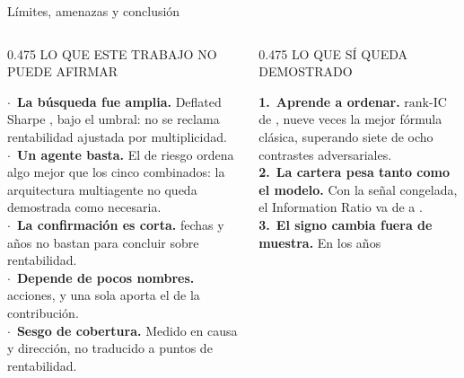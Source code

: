 \documentclass[aspectratio=169,11pt]{beamer}
\newcommand{\acto}{navy}
\newcommand{\actonombre}{}
\newcommand{\setacto}[2]{\renewcommand{\acto}{#1}\renewcommand{\actonombre}{#2}}
\newcommand{\rankic}{\text{rank-IC}}
\begin{document}
\setacto{navy}{Cierre}

\begin{frame}{Límites, amenazas y conclusión}
  \vspace{0.15cm}
  \begin{columns}[T]
    \begin{column}{0.475\linewidth}
      {\scriptsize\color{slate}\MakeUppercase{Lo que este trabajo no puede afirmar}}
      \par\medskip
      {\scriptsize
      \textcolor{rojo}{\textbf{$\cdot$}}~\textbf{La búsqueda fue amplia.} Deflated Sharpe
      \ProbabilidadDSR{}, bajo el umbral: no se reclama rentabilidad ajustada por
      multiplicidad.\\[0.40em]
      \textcolor{rojo}{\textbf{$\cdot$}}~\textbf{Un agente basta.} El de riesgo ordena algo mejor
      que los cinco combinados: la arquitectura multiagente no queda demostrada como
      necesaria.\\[0.40em]
      \textcolor{rojo}{\textbf{$\cdot$}}~\textbf{La confirmación es corta.}
      \CohortesReservadas{} fechas y \AnosCarteraReservada{} años no bastan para concluir sobre
      rentabilidad.\\[0.40em]
      \textcolor{rojo}{\textbf{$\cdot$}}~\textbf{Depende de pocos nombres.}
      \NumAccionesCartera{} acciones, y una sola aporta el \ContribucionAAPL{} de la
      contribución.\\[0.40em]
      \textcolor{rojo}{\textbf{$\cdot$}}~\textbf{Sesgo de cobertura.} Medido en causa y dirección,
      no traducido a puntos de rentabilidad.}
    \end{column}
    \begin{column}{0.475\linewidth}
      {\scriptsize\color{slate}\MakeUppercase{Lo que sí queda demostrado}}
      \par\medskip
      {\scriptsize
      \textcolor{verde}{\textbf{1.}}~\textbf{Aprende a ordenar.} $\rankic$ de \RankICSeleccion{},
      nueve veces la mejor fórmula clásica, superando siete de ocho contrastes
      adversariales.\\[0.40em]
      \textcolor{verde}{\textbf{2.}}~\textbf{La cartera pesa tanto como el modelo.} Con la señal
      congelada, el Information Ratio va de \IRModelo{} a \IRCartera{}.\\[0.40em]
      \textcolor{verde}{\textbf{3.}}~\textbf{El signo cambia fuera de muestra.} En los años
}
\end{column}
\end{columns}
\end{frame}
\end{document}
